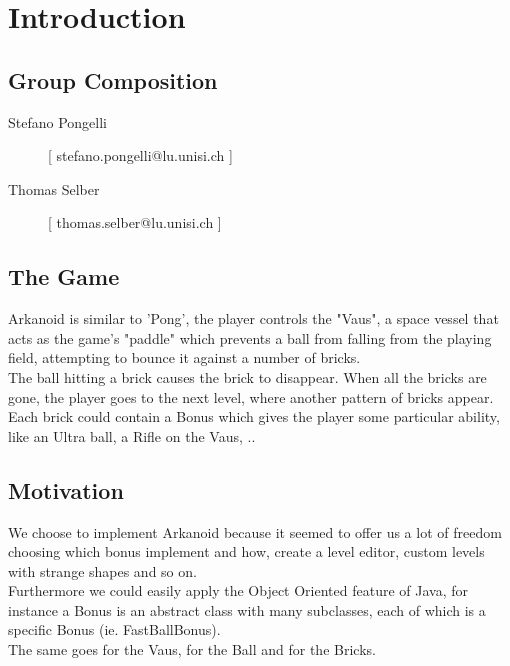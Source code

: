 \chapter*{Introduction}
\label{cha:intro}
\section*{Group Composition}
\label{sec:group}
\begin{description}
  \item[Stefano Pongelli] [ stefano.pongelli@lu.unisi.ch ]
  \item[Thomas Selber] [ thomas.selber@lu.unisi.ch ]
\end{description}
\section*{The Game}
\label{sec:game}
Arkanoid is similar to 'Pong', the player controls the "Vaus", a space vessel that acts as the game's "paddle" which prevents a ball from falling from the playing field, attempting to bounce it against a number of bricks.\\
The ball hitting a brick causes the brick to disappear. When all the bricks are gone, the player goes to the next level, where another pattern of bricks appear.\\
Each brick could contain a Bonus which gives the player some particular ability, like an Ultra ball, a Rifle on the Vaus, .. 

\section*{Motivation}
\label{sec:moti}

We choose to implement Arkanoid because it seemed to offer us a lot of freedom choosing which bonus implement and how, create a level editor, custom levels with strange shapes and so on. \\
Furthermore we could easily apply the Object Oriented feature of Java, for instance a Bonus is an abstract class with many subclasses, each of which is a specific Bonus (ie. FastBallBonus).\\
The same goes for the Vaus, for the Ball and for the Bricks.\\